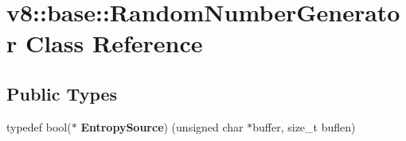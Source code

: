 \hypertarget{classv8_1_1base_1_1_random_number_generator}{}\section{v8\+:\+:base\+:\+:Random\+Number\+Generator Class Reference}
\label{classv8_1_1base_1_1_random_number_generator}
\subsection*{Public Types}
\begin{DoxyCompactItemize}
\item 
typedef bool($\ast$ {\bfseries Entropy\+Source}) (unsigned char $\ast$buffer, size\+\_\+t buflen)\hypertarget{classv8_1_1base_1_1_random_number_generator_ab60ef43489dd07c6d39d1fa1e117f625}{}\label{classv8_1_1base_1_1_random_number_generator_ab60ef43489dd07c6d39d1fa1e117f625}

\end{DoxyCompactItemize}

